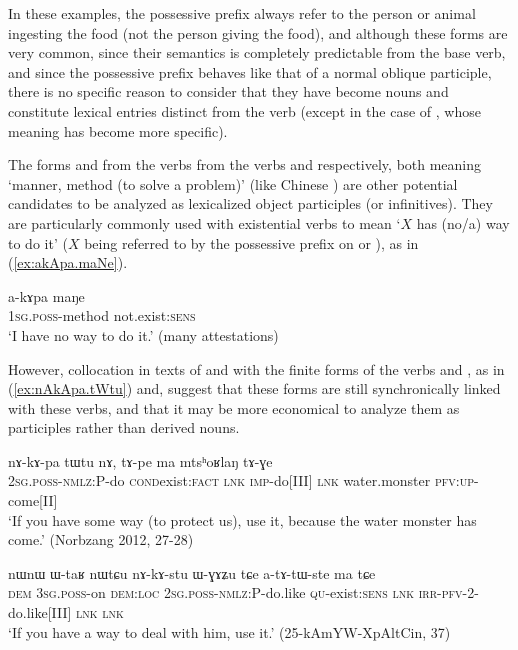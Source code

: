 In these examples, the possessive prefix always refer to the person or animal ingesting the food (not the person giving the food), and although these forms are very common, since their semantics is completely predictable from the base verb, and since the possessive prefix behaves like that of a normal oblique participle, there is no specific reason to consider that they have become nouns and constitute lexical entries distinct from the verb (except in the case of , whose meaning has become more specific).

The forms  and  from the verbs from the verbs  and  respectively, both meaning `manner, method (to solve a problem)' (like Chinese ) are other potential candidates to be analyzed as lexicalized object participles (or infinitives).  They are particularly commonly used with existential verbs to mean `$X$ has (no/a) way to do it' ($X$ being referred to by the possessive prefix on  or ), as in (\ref{ex:akApa.maNe}).

\begin{exe}
\ex \label{ex:akApa.maNe}
\gll a-kɤpa maŋe \\
\textsc{1sg}.\textsc{poss}-method not.exist:\textsc{sens} \\
\glt `I have no way to do it.' (many attestations)
\end{exe}
 
However, collocation in texts of  and  with the finite forms of the verbs  and , as in (\ref{ex:nAkApa.tWtu}) and, suggest that these forms are still synchronically linked with these verbs, and that it may be more economical to analyze them as participles rather than derived nouns.
 
 \begin{exe}
\ex \label{ex:nAkApa.tWtu}
\gll  nɤ-kɤ-pa tɯ\redp{}tu nɤ,  tɤ-pe ma mtsʰoʁlaŋ tɤ-ɣe  \\
\textsc{2sg}.\textsc{poss}-\textsc{nmlz}:P-do \textsc{cond}\redp{}exist:\textsc{fact} \textsc{lnk} \textsc{imp}-do[III] \textsc{lnk} water.monster \textsc{pfv}:\textsc{up}-come[II] \\
\glt `If you have some way (to protect us), use it, because the water monster has come.' (Norbzang 2012, 27-28)
 \end{exe}
 
  \begin{exe}
\ex \label{ex:nAkAstu.WGAZu}
\gll   nɯnɯ ɯ-taʁ nɯtɕu nɤ-kɤ-stu ɯ-ɣɤʑu tɕe a-tɤ-tɯ-ste ma tɕe \\
\textsc{dem} \textsc{3sg}.\textsc{poss}-on \textsc{dem}:\textsc{loc} \textsc{2sg}.\textsc{poss}-\textsc{nmlz}:P-do.like \textsc{qu}-exist:\textsc{sens} \textsc{lnk} \textsc{irr}-\textsc{pfv}-2-do.like[III] \textsc{lnk} \textsc{lnk} \\
\glt `If you have a way to deal with him, use it.'   (25-kAmYW-XpAltCin, 37)
 \end{exe}
 
